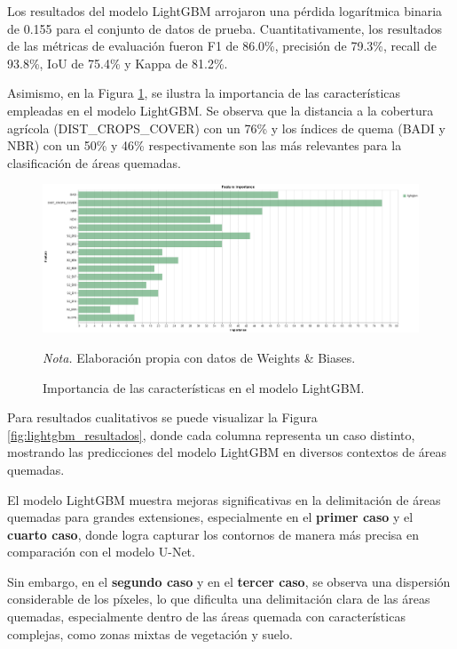 Los resultados del modelo LightGBM arrojaron una pérdida logarítmica binaria de 0.155 para el conjunto de datos de prueba. 
Cuantitativamente, los resultados de las métricas de evaluación fueron F1 de 86.0\%, precisión de 79.3\%, recall de 93.8\%,
IoU de 75.4\% y Kappa de 81.2\%.

Asimismo, en la Figura \ref{fig:feature_importance}, se ilustra la importancia de las características empleadas en el modelo LightGBM. Se observa que la distancia a la cobertura agrícola (DIST\_CROPS\_COVER) 
con un 76\% y los índices de quema (BADI y NBR) con un 50\% y 46\% respectivamente son las más relevantes para la clasificación de áreas quemadas.

\begin{figure}[H]
    \centering
    \caption{Importancia de las características en el modelo LightGBM.}
    \label{fig:feature_importance}
    \includegraphics[width=1\textwidth]{img/7_resultados/feature_importance.png}
    \begin{flushleft}
        \textit{Nota.} Elaboración propia con datos de Weights \& Biases.
        \vspace{-\baselineskip}
    \end{flushleft}
\end{figure}

Para resultados cualitativos se puede visualizar la Figura \ref{fig:lightgbm_resultados}, donde cada columna representa un caso distinto, mostrando las predicciones del modelo LightGBM en diversos contextos de 
áreas quemadas.

El modelo LightGBM muestra mejoras significativas en la delimitación de áreas quemadas para grandes extensiones, especialmente en el \textbf{primer caso} y el \textbf{cuarto caso}, donde logra capturar los 
contornos de manera más precisa en comparación con el modelo U-Net.

Sin embargo, en el \textbf{segundo caso} y en el \textbf{tercer caso}, se observa una dispersión considerable de los píxeles, lo que dificulta una delimitación clara de las áreas quemadas, especialmente dentro
de las áreas quemada con características complejas, como zonas mixtas de vegetación y suelo.

